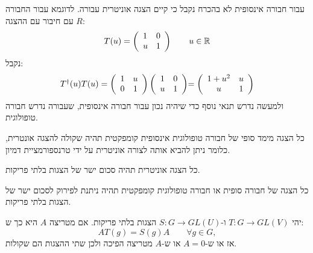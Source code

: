 \documentclass{tstextbook}
\begin{document}
\begin{remark}
עבור חבורה אינסופית לא בהכרח נקבל כי קיים הצגה אוניטרית עבורה. לדוגמא עבור החבורה \(R\) עם חיבור עם ההצגה:
$$T(u)={\left(\begin{array}{l l}{1}&{0}\\ {u}&{1}\end{array}\right)}\,\qquad u\in\mathbb{R}$$
נקבל:
$$\begin{array}{c}{{T^{\dagger}(u)T(u)=\left(\begin{array}{c c}{{1}}&{{u}}\\ {{0}}&{{1}}\end{array}\right)\left(\begin{array}{c c}{{1}}&{{0}}\\ {{u}}&{{1}}\end{array}\right)}} {{=\left(\begin{array}{c c}{{1+u^{2}}}&{{u}}\\ {{u}}&{{1}}\end{array}\right)}}\end{array}$$
ולמעשה נדרש תנאי נוסף כדי שיהיה נכון עבור חבורה אינסופית, שעבורה נדרש חבורה טופולוגית.

\end{remark}
\begin{proposition}
כל הצגה מימד סופי של חבורה טופולוגית אינסופית קומפקטית תהיה שקולה להצגה אונטרית, כלומר ניתן להביא אותה לצורה אוניטרית על ידי טרנספורמציית דמיון.

\end{proposition}
\begin{proposition}
כל הצגה אוניטרית תהיה סכום ישר של הצגות בלתי פריקות.

\end{proposition}
\begin{corollary}
כל הצגה של חבורה סופית או חבורה טופולוגית קומפקטית תהיה ניתנת לפירוק לסכום ישר של הצגות בלתי פריקות.

\end{corollary}
\begin{lemma}
יהי \(T:G\to GL(V)\) ו-\(S:G\to GL(U)\) הצגות בלתי פריקות. אם מטריצה \(A\) היא כך ש:
$$A T(g)=S(g)A\qquad\forall g\in G,$$
אז או ש-\(A=0\) או ש-\(A\) מטריצה הפיכה ולכן שתי ההצגות הם שקולות.

\end{lemma}
\end{document}
